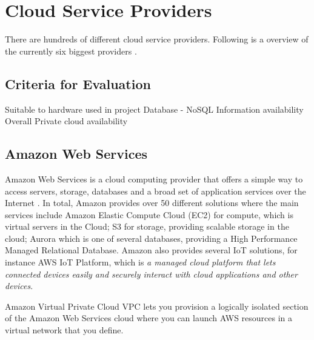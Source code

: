 \chapter{Cloud Service Providers}
There are hundreds of different cloud service providers. Following is a overview of the currently six biggest providers \cite{10biggest} \cite{Forbestop}.

\section{Criteria for Evaluation}
Suitable to hardware used in project
Database - NoSQL
Information availability 
Overall
Private cloud availability

\section{Amazon Web Services}
Amazon Web Services is a cloud computing provider that offers a simple way to access servers, storage, databases and a broad set of application services over the Internet \cite{Amazon}. In total, Amazon provides over 50 different solutions where the main services include  Amazon Elastic Compute Cloud (EC2) for compute, which is virtual servers in the Cloud; S3 for storage, providing scalable storage in the cloud; Aurora which is one of several databases, providing a High Performance Managed Relational Database. Amazon also provides several IoT solutions, for instance AWS IoT Platform, which is \textit{a managed cloud platform that lets connected devices easily and securely interact with cloud applications and other devices}.


Amazon Virtual Private Cloud VPC lets you provision a logically isolated section of the Amazon Web Services cloud where you can launch AWS resources in a virtual network that you define. \cite{predictive}

